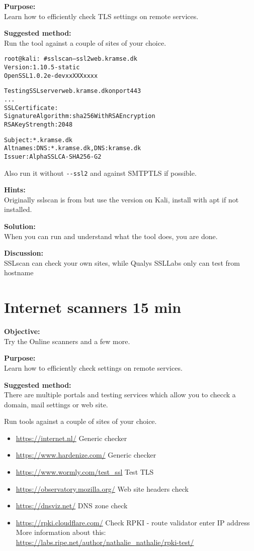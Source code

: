 \documentclass[a4paper,11pt,notitlepage]{report}
\begin{document}
{\bf Purpose:}\\
Learn how to efficiently check TLS settings on remote services.

{\bf Suggested method:}\\
Run the tool against a couple of sites of your choice.

\begin{alltt}\small
root@kali:~# sslscan --ssl2 web.kramse.dk
Version: 1.10.5-static
OpenSSL 1.0.2e-dev xx XXX xxxx

Testing SSL server web.kramse.dk on port 443
...
  SSL Certificate:
Signature Algorithm: sha256WithRSAEncryption
RSA Key Strength:    2048

Subject:  *.kramse.dk
Altnames: DNS:*.kramse.dk, DNS:kramse.dk
Issuer:   AlphaSSL CA - SHA256 - G2
\end{alltt}

Also run it without \verb+--ssl2+ and against SMTPTLS if possible.

{\bf Hints:}\\
Originally sslscan is from  but use the version on Kali, install with apt if not installed.

{\bf Solution:}\\
When you can run and understand what the tool does, you are done.

{\bf Discussion:}\\
SSLscan can check your own sites, while Qualys SSLLabs only can test from hostname



\chapter{Internet scanners 15 min}
\label{ex:web-site-check}

{\bf Objective:}\\
Try the Online scanners  and a few more.

{\bf Purpose:}\\
Learn how to efficiently check settings on remote services.

{\bf Suggested method:}\\
There are multiple portals and testing services which allow you to checck a domain,
mail settings or web site.

Run tools against a couple of sites of your choice.
\begin{itemize}
\item \url{https://internet.nl/} Generic checker
\item \url{https://www.hardenize.com/} Generic checker
\item \url{https://www.wormly.com/test_ssl} Test TLS
\item \url{https://observatory.mozilla.org/} Web site headers check
\item \url{https://dnsviz.net/} DNS zone check
\item \url{https://rpki.cloudflare.com/} Check RPKI - route validator enter
IP address\\
More information about this: \url{https://labs.ripe.net/author/nathalie_nathalie/rpki-test/}
\end{itemize}
\end{document}

